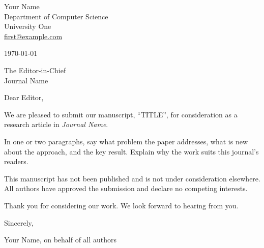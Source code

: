 \documentclass[11pt]{article}
\begin{document}
\begin{flushright}
Your Name\\
Department of Computer Science\\
University One\\
\href{mailto:first@example.com}{first@example.com}
\end{flushright}

\today

The Editor-in-Chief\\
Journal Name

Dear Editor,

We are pleased to submit our manuscript, ``{{TITLE}}'', for consideration as
a research article in \emph{Journal Name}.

In one or two paragraphs, say what problem the paper addresses, what is new
about the approach, and the key result. Explain why the work suits this
journal's readers.

This manuscript has not been published and is not under consideration
elsewhere. All authors have approved the submission and declare no competing
interests.

Thank you for considering our work. We look forward to hearing from you.

Sincerely,

\vspace{1.5em}
Your Name, on behalf of all authors
\end{document}
